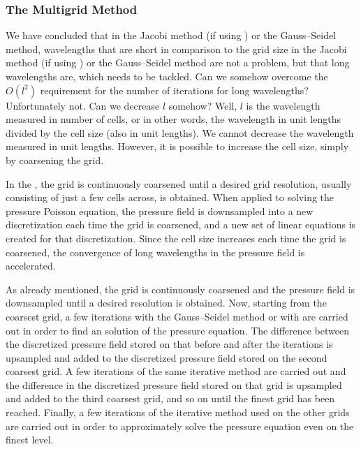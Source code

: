 
\subsubsection{The Multigrid Method}

We have concluded that in the Jacobi method (if using \SOR) or the Gauss--Seidel method, wavelengths that are short in comparison to the grid size in the Jacobi method (if using \SOR) or the Gauss--Seidel method are not a problem, but that long wavelengths are, which needs to be tackled. Can we somehow overcome the $O(l^2)$ requirement for the number of iterations for long wavelengths? Unfortunately not. Can we decrease $l$ somehow? Well, $l$ is the wavelength measured in number of cells, or in other words, the wavelength in unit lengths divided by the cell size (also in unit lengths). We cannot decrease the wavelength measured in unit lengths. However, it is possible to increase the cell size, simply by coarsening the grid.

In the , the grid is continuously coarsened until a desired grid resolution, usually consisting of just a few cells across, is obtained. When applied to solving the pressure Poisson equation, the pressure field is downsampled into a new discretization each time the grid is coarsened, and a new set of linear equations is created for that discretization. Since the cell size increases each time the grid is coarsened, the convergence of long wavelengths in the pressure field is accelerated.

As already mentioned, the grid is continuously coarsened and the pressure field is downsampled until a desired resolution is obtained. Now, starting from the coarsest grid, a few iterations with the Gauss--Seidel method or with \SOR are carried out in order to find an \approximate solution of the pressure equation. The difference between the discretized pressure field stored on that before and after the iterations is upsampled and added to the discretized pressure field stored on the second coarsest grid. A few iterations of the same iterative method are carried out and the difference in the discretized pressure field stored on that grid is upsampled and added to the third coarsest grid, and so on until the finest grid has been reached. Finally, a few iterations of the iterative method used on the other grids are carried out in order to approximately solve the pressure equation even on the finest level.

